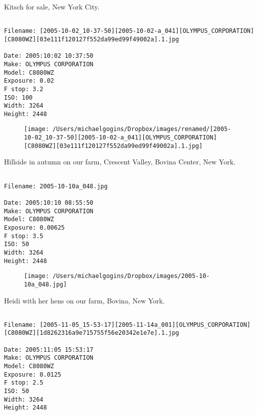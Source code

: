 \clearpage
\onecolumn
\noindent Kitsch for sale, New York City.
\noindent
\begin{lstlisting}

Filename: [2005-10-02_10-37-50][2005-10-02-a_041][OLYMPUS_CORPORATION][C8080WZ][03e111f120127f552da99ed99f49002a].1.jpg

Date: 2005:10:02 10:37:50
Make: OLYMPUS CORPORATION
Model: C8080WZ
Exposure: 0.02
F stop: 3.2
ISO: 100
Width: 3264
Height: 2448
\end{lstlisting}
\clearpage

\begin{figure}
\texttt{[image: /Users/michaelgogins/Dropbox/images/renamed/[2005-10-02\_10-37-50][2005-10-02-a\_041][OLYMPUS\_CORPORATION][C8080WZ][03e111f120127f552da99ed99f49002a].1.jpg]}
\end{figure}
    
\clearpage
\onecolumn
\noindent Hillside in autumn on our farm, Crescent Valley, Bovina Center, New York.
\noindent
\begin{lstlisting}

Filename: 2005-10-10a_048.jpg

Date: 2005:10:10 08:55:50
Make: OLYMPUS CORPORATION
Model: C8080WZ
Exposure: 0.00625
F stop: 3.5
ISO: 50
Width: 3264
Height: 2448
\end{lstlisting}
\clearpage

\begin{figure}
\texttt{[image: /Users/michaelgogins/Dropbox/images/2005-10-10a\_048.jpg]}
\end{figure}
    
\clearpage
\onecolumn
\noindent Heidi with her hens on our farm, Bovina, New York.
\noindent
\begin{lstlisting}

Filename: [2005-11-05_15-53-17][2005-11-14a_001][OLYMPUS_CORPORATION][C8080WZ][1d8262316a9e715755f56e20342e1e7e].1.jpg

Date: 2005:11:05 15:53:17
Make: OLYMPUS CORPORATION
Model: C8080WZ
Exposure: 0.0125
F stop: 2.5
ISO: 50
Width: 3264
Height: 2448
\end{lstlisting}
\clearpage

